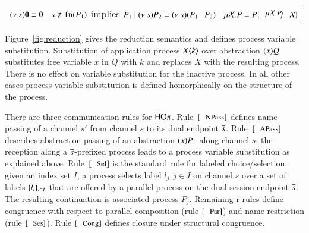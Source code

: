 \begin{tabular}{c}
	$(\nu\ s) \mathbf{0} \equiv \mathbf{0} \quad
	s \notin \mathtt{fn}(P_1)$ implies $P_1 \Par \news{s} P_2 \scong \news{s}(P_1 \Par P_2)
	\quad \rec{X}{P} \scong P\subst{\rec{X}{P}}{\rvar{X}}$
\end{tabular}

\noindent Figure~\ref{fig:reduction} gives the 
reduction semantics and defines process variable substitution. 
Substitution of application process $X\langle k \rangle$
over abstraction $(x)Q$ substitutes free variable
$x$ in $Q$ with $k$ and replaces $X$ with the resulting process.
There is no effect on variable substitution for the inactive process.
In all other cases process variable substitution is defined homorphically 
on the structure of the process.



There are three communication rules for $\mathsf{HO}\pi$. 
Rule~$\orule{NPass}$ defines name passing 
of a channel $s'$ from channel $s$ to its dual endpoint $\overline{s}$.
Rule~$\orule{APass}$ describes
abstraction passing of an abstraction $(x)P_1$
along channel $s$; the reception along a $\overline{s}$-prefixed process leads to a process variable
substitution as explained above.
Rule~$\orule{Sel}$ is the standard rule for labeled choice/selection:
given an index set $I$, 
a process selects label $l_j, j \in I$ on channel $s$ over a set of
labels $\{l_i\}_{i \in I}$ that are offered by a parallel process
on the dual session endpoint $\overline{s}$. The resulting continuation is associated process $P_j$.
Remaining r rules 
define congruence with respect to parallel composition (rule $\orule{Par}$) and name restriction (rule $\orule{Ses}$).
Rule $\orule{Cong}$ defines closure under structural congruence.



